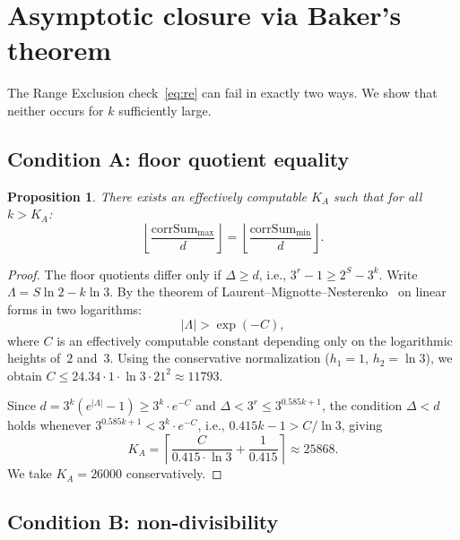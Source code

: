 \documentclass[11pt, a4paper]{amsart}
\theoremstyle{plain}
\newtheorem{proposition}[theorem]{Proposition}
\theoremstyle{definition}
\theoremstyle{remark}
\newcommand{\corrSum}{\mathrm{corrSum}}
\begin{document}
\section{Asymptotic closure via Baker's theorem}\label{sec:baker}

The Range Exclusion check~\eqref{eq:re} can fail in exactly
two ways.  We show that neither occurs for $k$ sufficiently large.

\subsection{Condition A: floor quotient equality}
\label{ssec:condition-a}

\begin{proposition}\label{prop:cond-a}
  There exists an effectively computable $K_A$ such that for
  all $k > K_A$:
  \[
    \left\lfloor \frac{\corrSum_{\max}}{d} \right\rfloor
    = \left\lfloor \frac{\corrSum_{\min}}{d} \right\rfloor.
  \]
\end{proposition}

\begin{proof}
  The floor quotients differ only if $\Delta \geq d$, i.e.,
  $3^r - 1 \geq 2^S - 3^k$.  Write $\Lambda = S \ln 2 - k \ln 3$.
  By the theorem of Laurent--Mignotte--Nesterenko~\cite{LMN1995}
  on linear forms in two logarithms:
  \begin{equation}\label{eq:lmn}
    |\Lambda| > \exp(-C),
  \end{equation}
  where $C$ is an effectively computable constant depending only on
  the logarithmic heights of~$2$ and~$3$.
  Using the conservative normalization
  ($h_1 = 1$, $h_2 = \ln 3$), we obtain
  $C \leq 24.34 \cdot 1 \cdot \ln 3 \cdot 21^2 \approx 11793$.

  Since $d = 3^k(e^{|\Lambda|} - 1) \geq 3^k \cdot e^{-C}$ and
  $\Delta < 3^r \leq 3^{0.585k+1}$, the condition $\Delta < d$ holds
  whenever
  $3^{0.585k+1} < 3^k \cdot e^{-C}$, i.e.,
  $0.415k - 1 > C/\ln 3$, giving
  \[
    K_A = \left\lceil \frac{C}{0.415 \cdot \ln 3} + \frac{1}{0.415}
    \right\rceil \approx 25868.
  \]
  We take $K_A = 26000$ conservatively.
\end{proof}

\subsection{Condition B: non-divisibility}\label{ssec:condition-b}
\end{document}
